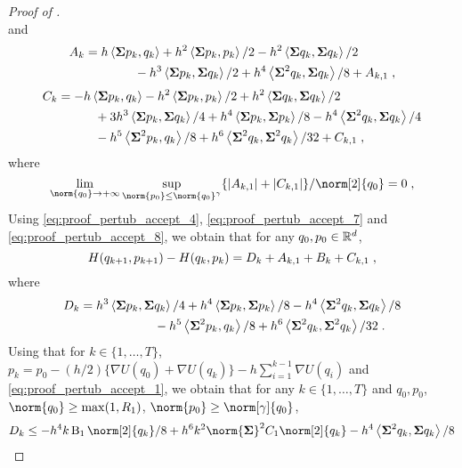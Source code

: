 \begin{proof}[Proof of ]
\begin{equation}
\end{equation}
and
\begin{align}
  \label{eq:proof_pertub_accept_7}
  A_k &= h\left\langle\boldsymbol{\Sigma} p_k,q_k \right\rangle + h^2 \left\langle\boldsymbol{\Sigma} p_k,p_k \right\rangle/2 -h^2 \left\langle\boldsymbol{\Sigma} q_k ,\boldsymbol{\Sigma} q_k  \right\rangle/2 \\
  & \qquad \qquad - h^3 \left\langle\boldsymbol{\Sigma} p_k,\boldsymbol{\Sigma} q_k  \right\rangle/2  +  h^4 \left\langle\boldsymbol{\Sigma}^2 q_k,\boldsymbol{\Sigma} q_k  \right\rangle /8  + A_{k,1}  \;,
\end{align}
\begin{align}
    C_k & = -h\left\langle\boldsymbol{\Sigma} p_k,q_k \right\rangle -h^2 \left\langle\boldsymbol{\Sigma} p_k,p_k \right\rangle/2 +h^2 \left\langle\boldsymbol{\Sigma} q_k ,\boldsymbol{\Sigma} q_k  \right\rangle/2\\
  & \qquad \quad  +3h^3 \left\langle\boldsymbol{\Sigma} p_k,\boldsymbol{\Sigma} q_k \right\rangle/4  + h^4 \left\langle\boldsymbol{\Sigma} p_k ,\boldsymbol{\Sigma} p_k \right\rangle/8  
    -h^4 \left\langle\boldsymbol{\Sigma}^2 q_k ,\boldsymbol{\Sigma} q_k \right\rangle /4 \\
  &\qquad \quad -h^5 \left\langle\boldsymbol{\Sigma}^2 p_k,q_k \right\rangle/8 
    + h^6 \left\langle\boldsymbol{\Sigma}^2 q_k ,\boldsymbol{\Sigma}^2 q_k \right\rangle/32  + C_{k,1} \;,
    \label{eq:proof_pertub_accept_8}
\end{align}
where
\begin{equation}
\label{eq:proof_pertub_accept_9}
  \lim_{\norm{q_0} \to \plusinfty} \sup_{\norm{p_0} \leq \norm{q_0}^\gamma} \{\abs{A_{k,1}} + \abs{C_{k,1}}\}/\norm[2]{q_0} =0 \eqsp,
\end{equation}
Using \eqref{eq:proof_pertub_accept_4}, \eqref{eq:proof_pertub_accept_7} and \eqref{eq:proof_pertub_accept_8}, we obtain that for any $q_0,p_0 \in \mathbb{R}^d$,
\begin{equation}
  \label{eq:proof_pertub_accept_10}
  H(q_{k+1},p_{k+1}) - H(q_k,p_k) = D_k + A_{k,1}+  B_k + C_{k,1} \;,
\end{equation}
where
\begin{align}
  D_k &= h^3 \left\langle\boldsymbol{\Sigma} p_k,\boldsymbol{\Sigma} q_k \right\rangle/4 + h^4 \left\langle\boldsymbol{\Sigma} p_k ,\boldsymbol{\Sigma} p_k \right\rangle/8   -h^4 \left\langle\boldsymbol{\Sigma}^2 q_k ,\boldsymbol{\Sigma} q_k \right\rangle /8 \\
&  \qquad \qquad \qquad -h^5 \left\langle\boldsymbol{\Sigma}^2 p_k,q_k \right\rangle/8 + h^6 \left\langle\boldsymbol{\Sigma}^2 q_k ,\boldsymbol{\Sigma}^2 q_k \right\rangle/32 \;.
\end{align}
Using that for $k \in \{1,\ldots,T\}$,  $p_k= p_0 -(h/2)\{\nabla U(q_0) + \nabla U(q_k)\} - h \sum_{i=1}^{k-1} \nabla U(q_i)$ and \eqref{eq:proof_pertub_accept_1}, we obtain that for any $k\in \{1,\ldots,T\}$ and $q_0,p_0$, $\norm{q_0} \geq \max(1,R_1)$, $\norm{p_0} \geq \norm[\gamma]{q_0}$,
\begin{align}
  D_k &\leq -h^4 k \BB_1 \norm[2]{q_k}/8 + h^6k^2 \norm{\Sigmabf}^2 C_1 \norm[2]{q_k}  - h^4 \ps{\Sigmabf^2 q_k }{\Sigmabf q_k} /8 \\

\end{align}
\end{proof}
